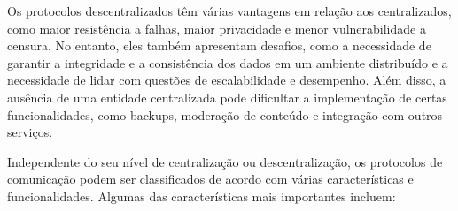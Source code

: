 
Os protocolos descentralizados têm várias vantagens em relação aos centralizados, como maior resistência a falhas, maior privacidade e menor vulnerabilidade a censura. No entanto, eles também apresentam desafios, como a necessidade de garantir a integridade e a consistência dos dados em um ambiente distribuído e a necessidade de lidar com questões de escalabilidade e desempenho. Além disso, a ausência de uma entidade centralizada pode dificultar a implementação de certas funcionalidades, como backups, moderação de conteúdo e integração com outros serviços.

Independente do seu nível de centralização ou descentralização, os protocolos de comunicação podem ser classificados de acordo com várias características e funcionalidades. Algumas das características mais importantes incluem:


